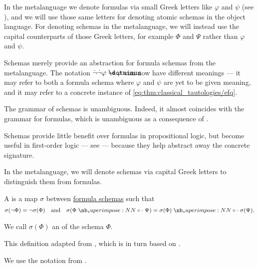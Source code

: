\begin{comments}
  \item In the metalanguage we denote formulas via small Greek letters like \( \varphi \) and \( \psi \) (see ), and we will use those same letters for denoting atomic schemas in the object language. For denoting schemas in the metalanguage, we will instead use the capital counterparts of those Greek letters, for example \( \Phi \) and \( \Psi \) rather than \( \varphi \) and \( \psi \).
  \item Schemas merely provide an abstraction for formula schemas from the metalanguage. The notation \( \synneg \synneg \varphi \synimplies \varphi \) can now have different meanings --- it may refer to both a formula schema where \( \varphi \) and \( \psi \) are yet to be given meaning, and it may refer to a concrete instance of \eqref{eq:thm:classical_tautologies/efq}.
  \item The grammar of schemas is unambiguous. Indeed, it almost coincides with the grammar for formulas, which is unambiguous as a consequence of .
  \item Schemas provide little benefit over formulas in propositional logic, but become useful in first-order logic --- see  --- because they help abstract away the concrete signature.
  \item In the metalanguage, we will denote schemas via capital Greek letters to distinguish them from formulas.
\end{comments}

\begin{definition}\label{def:uniform_schema_substitution}\mimprovised
  A  is a map \( \sigma \) between \hyperref[def:formula_schema]{formula schemas} such that
  \begin{align*}
    \sigma(\neg \Phi) = \neg \sigma(\Phi) &&\T{and}&& \sigma(\Phi \syncirc \Psi) = \sigma(\Phi) \syncirc \sigma(\Psi).
  \end{align*}

  We call \( \sigma(\Phi) \) an  of the schema \( \Phi \).
\end{definition}
\begin{comments}
  \item This definition adapted from , which is in turn based on \cite[def. 3.1.3]{CitkinMuravitsky2021}.
  \item We use the notation from .
\end{comments}

